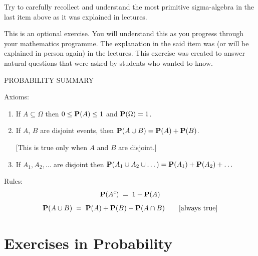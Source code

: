 \ee

\begin{Exercise}[title={Intuiting a most primitive sigma-algebra -- this is optional},label={underMPSA}]
Try to carefully recollect and understand the most primitive sigma-algebra in the last item above as it was explained in lectures.
\end{Exercise}
\begin{Answer}
This is an optional exercise. You will understand this as you progress through your mathematics programme. 
The explanation in the said item was (or will be explained in person again) in the lectures. 
This exercise was created to answer natural questions that were asked by students who wanted to know.
\end{Answer}


\begin{framed}
PROBABILITY SUMMARY

\medskip

Axioms:
\begin{enumerate}
\item If $A\subseteq \Omega$ then $0\leq \mathbf{P}(A)\leq 1$ and $\mathbf{P}(\Omega)=1$.
\item If $A$, $B$ are disjoint events, then $\mathbf{P}(A\cup B)=\mathbf{P}(A)+\mathbf{P}(B)$.

[This is true only when $A$ and $B$ are disjoint.]
\item If $A_1,A_2,\dots$ are disjoint then $\mathbf{P}(A_1\cup A_2
\cup\dots)=\mathbf{P}(A_1)+\mathbf{P}(A_2)+\dots$
\end{enumerate}
Rules:
$$\mathbf{P}(A^c)\;=\;1-\mathbf{P}(A)$$
$$\mathbf{P}(A\cup B)\;=\;\mathbf{P}(A)+\mathbf{P}(B)-\mathbf{P}(A\cap B) \qquad [\textrm{always true}]$$
\end{framed}

\section{Exercises in Probability}\label{S:xsProbability}

